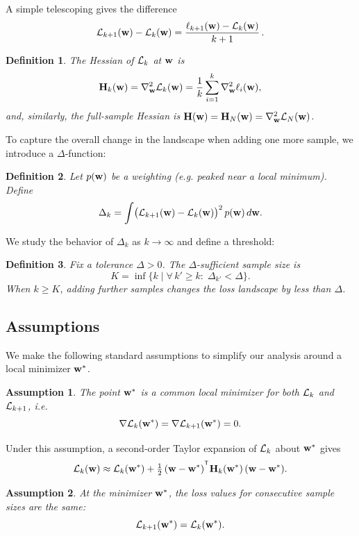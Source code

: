 \documentclass{article}
\newtheorem{definition}{Definition}
\newtheorem{assumption}{Assumption}
\begin{document}
A simple telescoping gives the difference
$$
  \mathcal{L}_{k+1}(\mathbf{w}) - \mathcal{L}_k(\mathbf{w}) =
  \frac{\ell_{k+1}(\mathbf{w}) - \mathcal{L}_k(\mathbf{w})}{k+1}\,.
$$

\begin{definition}
  The Hessian of $\mathcal{L}_k$ at $\mathbf{w}$ is
  $$
    \mathbf{H}_k(\mathbf{w}) =
    \nabla^2_{\mathbf{w}} \mathcal{L}_k(\mathbf{w}) =
    \frac1k \sum_{i=1}^k \nabla^2_{\mathbf{w}} \ell_i(\mathbf{w}),
  $$
  and, similarly, the full-sample Hessian is $\mathbf{H}(\mathbf{w}) = \mathbf{H}_N(\mathbf{w}) = \nabla^2_{\mathbf{w}} \mathcal{L}_N(\mathbf{w})$.
\end{definition}

To capture the overall change in the landscape when adding one more sample, we introduce a $\Delta$‑function:

\begin{definition}
  Let $p(\mathbf{w})$ be a weighting (e.g. peaked near a local minimum). Define
  $$
    \Delta_k =
    \int \bigl( \mathcal{L}_{k+1}(\mathbf{w}) - \mathcal{L}_k(\mathbf{w}) \bigr)^2\, p(\mathbf{w})\, d\mathbf{w}.
  $$
\end{definition}

We study the behavior of $\Delta_k$ as $k \to \infty$ and define a threshold:

\begin{definition}
  Fix a tolerance $\Delta > 0$. The \emph{$\Delta$-sufficient sample size} is
  $$
    K =
    \inf \{ k \mid \forall\, k' \ge k : \; \Delta_{k'} < \Delta\}.
  $$
  When $k \ge K$, adding further samples changes the loss landscape by less than $\Delta$.
\end{definition}

\subsection{Assumptions}

We make the following standard assumptions to simplify our analysis around a local minimizer $\mathbf{w}^*$.

\begin{assumption}
  The point $\mathbf{w}^*$ is a common local minimizer for both $\mathcal{L}_k$ and $\mathcal{L}_{k+1}$, i.e.
  $$
    \nabla \mathcal{L}_k(\mathbf{w}^*) =
    \nabla \mathcal{L}_{k+1}(\mathbf{w}^*) =
    0.
  $$
\end{assumption}

Under this assumption, a second‑order Taylor expansion of $\mathcal{L}_k$ about $\mathbf{w}^*$ gives
$$
  \cL_k(\bw) \approx
  \cL_k(\bw^*) + \tfrac12\, (\bw - \bw^*)^{\T} \bH_k(\bw^*)\, (\bw - \bw^*).
$$

\begin{assumption}
  At the minimizer $\mathbf{w}^*$, the loss values for consecutive sample sizes are the same:
  $$
    \mathcal{L}_{k+1}(\mathbf{w}^*) =
    \mathcal{L}_k(\mathbf{w}^*).
  $$
\end{assumption}
\end{document}
